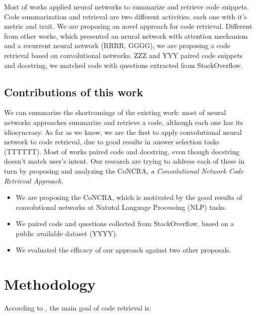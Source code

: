 \documentclass[sigconf]{acmart}
\begin{document}
Most of works applied neural networks to summarize and retrieve code snippets. Code summarization and retrieval are two different activities, each one with it's metric and trait. We are proposing an novel approach for code retrieval. Different from other works, which presented an neural network with attention mechanism and a recurrent neural network (RRRR, GGGG), we are proposing a code retrieval based on convolutional networks. ZZZ and YYY paired code snippets and docstring, we matched code with questions extracted from StackOverflow.

\subsection{Contributions of this work}

We can summarize the shortcomings of the existing work:
most of neural networks approaches summarize and retrieve a code, although each one has its idiosyncrasy. As far as we know, we are the first to apply convolutional neural network to code retrieval, due to good results in answer selection tasks (TTTTTT). Most of works paired code and docstring, even though docstring doesn't match user's intent. Our research are trying to address each of these in turn by proposing and analyzing the CoNCRA, \emph{a Convolutional Network Code Retrieval Approach}.

\begin{itemize}
    \item We are proposing the CoNCRA, which is motivated
by the good results of convolutional networks at Natutal Language Processing (NLP) tasks. 
    \item We paired code and questions collected from StackOverflow, based on a public available dataset (YYYY).

    \item We evaluated the efficacy of our approach against two other proposals.
    
\end{itemize}







\section{Methodology}

According to \cite{cambronero-deep-code-search-2019}, the main goal of code retrieval is:
\end{document}
